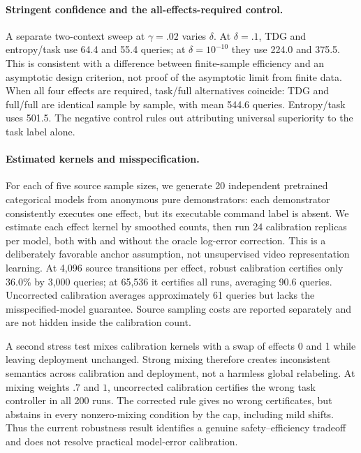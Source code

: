 \documentclass{article}
\begin{document}
\paragraph{Stringent confidence and the all-effects-required control.}
A separate two-context sweep at $\gamma=.02$ varies $\delta$. At $\delta=.1$, TDG and entropy/task use 64.4 and 55.4 queries; at $\delta=10^{-10}$ they use 224.0 and 375.5. This is consistent with a difference between finite-sample efficiency and an asymptotic design criterion, not proof of the asymptotic limit from finite data. When all four effects are required, task/full alternatives coincide: TDG and full/full are identical sample by sample, with mean 544.6 queries. Entropy/task uses 501.5. The negative control rules out attributing universal superiority to the task label alone.

\paragraph{Estimated kernels and misspecification.}\label{sec:learned}
For each of five source sample sizes, we generate 20 independent pretrained categorical models from anonymous pure demonstrators: each demonstrator consistently executes one effect, but its executable command label is absent. We estimate each effect kernel by smoothed counts, then run 24 calibration replicas per model, both with and without the oracle log-error correction. This is a deliberately favorable anchor assumption, not unsupervised video representation learning. At 4,096 source transitions per effect, robust calibration certifies only 36.0\% by 3,000 queries; at 65,536 it certifies all runs, averaging 90.6 queries. Uncorrected calibration averages approximately 61 queries but lacks the misspecified-model guarantee. Source sampling costs are reported separately and are not hidden inside the calibration count.

A second stress test mixes calibration kernels with a swap of effects 0 and 1 while leaving deployment unchanged. Strong mixing therefore creates inconsistent semantics across calibration and deployment, not a harmless global relabeling. At mixing weights $.7$ and $1$, uncorrected calibration certifies the wrong task controller in all 200 runs. The corrected rule gives no wrong certificates, but abstains in every nonzero-mixing condition by the cap, including mild shifts. Thus the current robustness result identifies a genuine safety--efficiency tradeoff and does not resolve practical model-error calibration.
\end{document}
